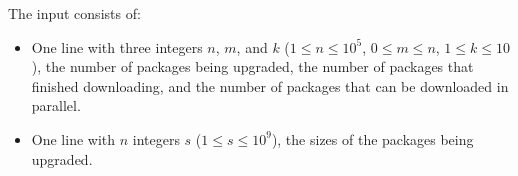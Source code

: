 
    The input consists of:
    \begin{itemize}
        \item One line with three integers $n$, $m$, and $k$ ($1\leq n\leq 10^5$, $0\leq m\leq n$, $1\leq k\leq 10$),
            the number of packages being upgraded,
            the number of packages that finished downloading, and
            the number of packages that can be downloaded in parallel.
        \item One line with $n$ integers $s$ ($1\leq s\leq 10^9$), the sizes of the packages being upgraded.
    \end{itemize}
